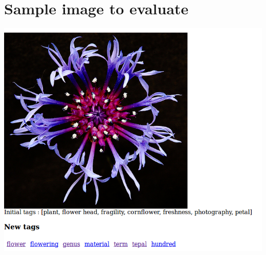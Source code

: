 \newpage

\section{Sample image to evaluate} %
\label{app:sample_image_to_evaluate}
\includegraphics[scale=0.6]{./prim/exampleEval}
